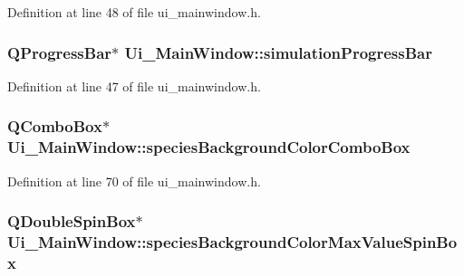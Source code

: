 \-Definition at line 48 of file ui\-\_\-mainwindow.\-h.

\hypertarget{class_ui___main_window_a851cc4465d87a72d072b6559eb6b3a2a}{
\subsubsection[{simulation\-Progress\-Bar}]{\setlength{\rightskip}{0pt plus 5cm}\-Q\-Progress\-Bar$\ast$ {\bf \-Ui\-\_\-\-Main\-Window\-::simulation\-Progress\-Bar}}}\label{class_ui___main_window_a851cc4465d87a72d072b6559eb6b3a2a}


\-Definition at line 47 of file ui\-\_\-mainwindow.\-h.

\hypertarget{class_ui___main_window_ac3c8d5fa9d1ee6504fb0c77918c8e3bf}{
\subsubsection[{species\-Background\-Color\-Combo\-Box}]{\setlength{\rightskip}{0pt plus 5cm}\-Q\-Combo\-Box$\ast$ {\bf \-Ui\-\_\-\-Main\-Window\-::species\-Background\-Color\-Combo\-Box}}}\label{class_ui___main_window_ac3c8d5fa9d1ee6504fb0c77918c8e3bf}


\-Definition at line 70 of file ui\-\_\-mainwindow.\-h.

\hypertarget{class_ui___main_window_a54a465855ecd4ab2fe51bdad8f2d0c81}{
\subsubsection[{species\-Background\-Color\-Max\-Value\-Spin\-Box}]{\setlength{\rightskip}{0pt plus 5cm}\-Q\-Double\-Spin\-Box$\ast$ {\bf \-Ui\-\_\-\-Main\-Window\-::species\-Background\-Color\-Max\-Value\-Spin\-Box}}}\label{class_ui___main_window_a54a465855ecd4ab2fe51bdad8f2d0c81}


